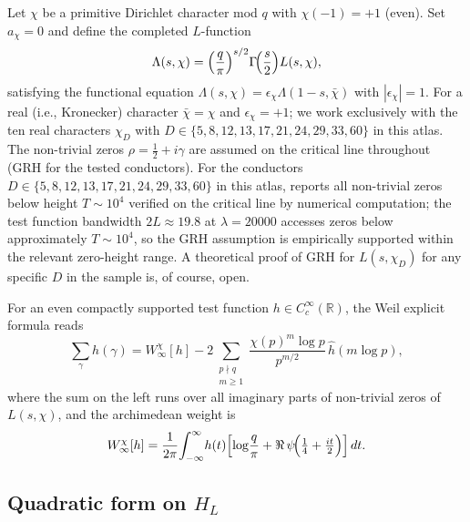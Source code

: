 \documentclass[10pt,twocolumn]{article}
\theoremstyle{definition}
\theoremstyle{remark}
\newcommand{\chifn}{\chi}
\newcommand{\halfline}{\tfrac{1}{2}}
\begin{document}
Let $\chifn$ be a primitive Dirichlet character mod $q$ with
$\chifn(-1)=+1$ (even). Set $a_{\chifn}=0$ and define the completed
$L$-function
\[
  \Lambda(s,\chifn)
    =\Bigl(\frac{q}{\pi}\Bigr)^{s/2}\Gamma\!\Bigl(\frac{s}{2}\Bigr)
      L(s,\chifn),
\]
satisfying the functional equation
$\Lambda(s,\chifn)=\epsilon_{\chifn}\Lambda(1-s,\bar\chifn)$ with
$|\epsilon_{\chifn}|=1$. For a real (i.e., Kronecker) character
$\bar\chifn=\chifn$ and $\epsilon_{\chifn}=+1$; we work exclusively
with the ten real characters $\chifn_D$ with $D\in\{5,8,12,13,17,21,
24,29,33,60\}$ in this atlas. The non-trivial zeros
$\rho=\halfline+i\gamma$ are assumed on the critical line throughout
(GRH for the tested conductors). For the conductors
$D\in\{5,8,12,13,17,21,24,29,33,60\}$ in this atlas, \cite{LMFDB}
reports all non-trivial zeros below height $T\sim 10^4$ verified on
the critical line by numerical computation; the test function
bandwidth $2L\approx 19.8$ at $\lambda=20000$ accesses zeros below
approximately $T\sim 10^4$, so the GRH assumption is empirically
supported within the relevant zero-height range. A theoretical proof
of GRH for $L(s,\chifn_D)$ for any specific $D$ in the sample is, of
course, open.

For an even compactly supported test function $h\in C_c^\infty
(\mathbb{R})$, the Weil explicit formula \cite{IwaniecKowalski} reads
\begin{equation}
\label{eq:weil}
  \sum_{\gamma}h(\gamma)
    = W^{\chifn}_\infty[h]
    - 2\sum_{\substack{p\nmid q\\m\geq 1}}
      \frac{\chifn(p)^m\log p}{p^{m/2}}\,\hat h(m\log p),
\end{equation}
where the sum on the left runs over all imaginary parts of non-trivial
zeros of $L(s,\chifn)$, and the archimedean weight is
\[
  W^{\chifn}_\infty[h]
    = \frac{1}{2\pi}\!\int_{-\infty}^{\infty}\! h(t)
      \Bigl[\log\!\frac{q}{\pi} + \Re\,\psi\!\Bigl(\tfrac14+\tfrac{it}{2}\Bigr)\Bigr]\,dt.
\]

\subsection{\texorpdfstring{Quadratic form on $H_L$}{Quadratic form on HL}}
\end{document}
